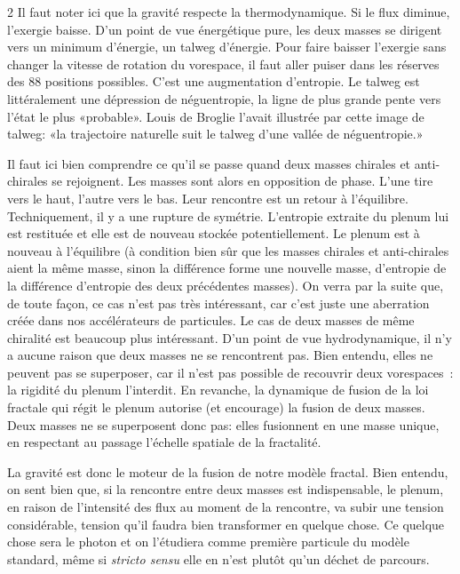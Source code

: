 \begin{multicols}{2}
Il faut noter ici que la gravité respecte la thermodynamique. Si le
flux diminue, l'exergie baisse. D'un point de vue énergétique pure, les deux
masses se dirigent vers un minimum d'énergie, un talweg d'énergie.
Pour faire baisser l'exergie sans changer la vitesse de rotation du
vorespace, il faut aller puiser dans les réserves des 88 positions
possibles. C'est une augmentation d'entropie. Le talweg est
littéralement une dépression de néguentropie, la ligne de plus grande
pente vers l'état le plus «probable». Louis de Broglie l'avait
illustrée par cette image de talweg: «la trajectoire naturelle suit
le talweg d'une vallée de néguentropie.» \cite{debroglie1964thermodynamique}

Il faut ici bien comprendre ce qu'il se passe quand deux masses chirales et
anti-chirales se rejoignent. Les masses sont alors en opposition de phase.
L'une tire vers le haut, l'autre vers le bas. Leur rencontre est un
retour à l'équilibre. Techniquement, il y a une rupture de symétrie.
L'entropie extraite du plenum lui est restituée et elle est de nouveau
stockée potentiellement. Le plenum est à nouveau à l'équilibre (à
condition bien sûr que les masses chirales et anti-chirales aient la
même masse, sinon la différence forme une nouvelle masse, d'entropie de la
différence d'entropie des deux précédentes masses). On verra par la
suite que, de toute façon, ce cas n'est pas très intéressant, car
c'est juste une aberration créée dans nos accélérateurs de particules.
Le cas de deux masses de même chiralité est beaucoup plus intéressant.
D'un point de vue hydrodynamique, il n'y a aucune raison que deux
masses ne se rencontrent pas. Bien entendu, elles ne peuvent pas se
superposer, car il n'est pas possible de recouvrir deux vorespaces :
la rigidité du plenum l'interdit. En revanche, la dynamique de fusion
de la loi fractale qui régit le plenum autorise (et encourage) la 
fusion de deux masses. Deux masses ne se superposent donc pas:
elles fusionnent en une masse unique, en respectant au passage
l'échelle spatiale de la fractalité.

La gravité est donc le moteur de la fusion de notre modèle fractal.
Bien entendu, on sent bien que, si la rencontre entre deux masses est
indispensable, le plenum, en raison de l'intensité des flux au moment
de la rencontre, va subir une tension considérable, tension qu'il
faudra bien transformer en quelque chose. Ce quelque chose sera le
photon et on l'étudiera comme première particule du modèle standard,
même si \textit{stricto sensu} elle en n'est plutôt qu'un déchet de parcours.


\end{multicols}
